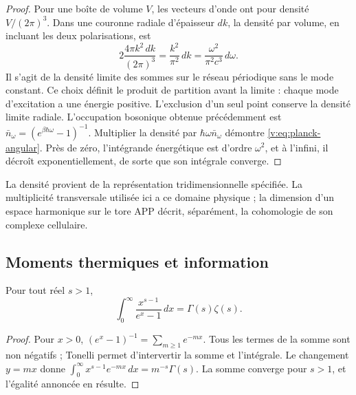 \begin{proof}
Pour une boîte de volume \(V\), les vecteurs d’onde ont pour densité
\(V/(2\pi)^3\). Dans une couronne radiale d’épaisseur \(dk\), la densité
par volume, en incluant les deux polarisations, est
\[
 2\frac{4\pi k^2\,dk}{(2\pi)^3}=\frac{k^2}{\pi^2}\,dk
 =\frac{\omega^2}{\pi^2c^3}\,d\omega.
\]
Il s’agit de la densité limite des sommes sur le réseau périodique
sans le mode constant. Ce choix définit le produit de partition
avant la limite : chaque mode d’excitation a une énergie positive.
L’exclusion d’un seul point conserve la densité limite radiale.
L’occupation bosonique obtenue précédemment est
\(\bar n_\omega=(e^{\beta\hbar\omega}-1)^{-1}\).
Multiplier la densité par \(\hbar\omega\bar n_\omega\) démontre
\eqref{v:eq:planck-angular}. Près de zéro, l’intégrande énergétique est
d’ordre \(\omega^2\), et à l’infini, il décroît exponentiellement, de sorte
que son intégrale converge.
\end{proof}

La densité provient de la représentation tridimensionnelle spécifiée.
La multiplicité transversale utilisée ici a ce domaine physique ;
la dimension d’un espace harmonique sur le tore APP décrit,
séparément, la cohomologie de son complexe cellulaire.



\subsection{Moments thermiques et information}

\begin{lemma}
\label{v:lem:momento-bosonico}
Pour tout réel \(s>1\),
\begin{equation}
 \int_0^\infty\frac{x^{s-1}}{e^x-1}\,dx
 =\Gamma(s)\zeta(s).
 \label{v:eq:momento-bosonico}
\end{equation}
\end{lemma}
\begin{proof}
Pour \(x>0\), \((e^x-1)^{-1}=\sum_{m\geq1}e^{-mx}\).
Tous les termes de la somme sont non négatifs ; Tonelli permet d’intervertir la somme
et l’intégrale. Le changement \(y=mx\) donne
\(\int_0^\infty x^{s-1}e^{-mx}\,dx=m^{-s}\Gamma(s)\).
La somme converge pour \(s>1\), et l’égalité annoncée en résulte.
\end{proof}

